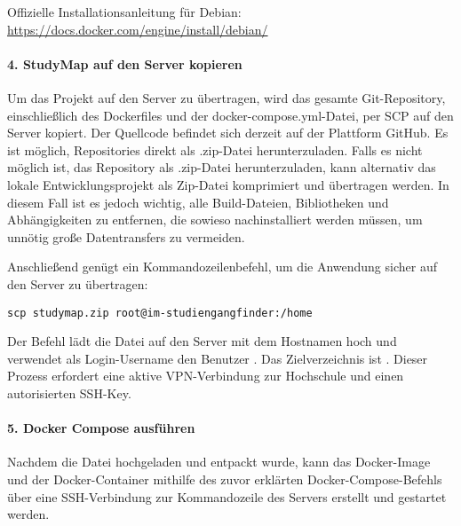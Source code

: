 \noindent
Offizielle Installationsanleitung für Debian: \url{https://docs.docker.com/engine/install/debian/}

\paragraph*{4. StudyMap auf den Server kopieren}
Um das Projekt auf den Server zu übertragen, wird das gesamte Git-Repository, einschließlich des Dockerfiles und der docker-compose.yml-Datei, per SCP auf den Server kopiert. Der Quellcode befindet sich derzeit auf der Plattform GitHub. Es ist möglich, Repositories direkt als .zip-Datei herunterzuladen. Falls es nicht möglich ist, das Repository als .zip-Datei herunterzuladen, kann alternativ das lokale Entwicklungsprojekt als Zip-Datei komprimiert und übertragen werden. In diesem Fall ist es jedoch wichtig, alle Build-Dateien, Bibliotheken und Abhängigkeiten zu entfernen, die sowieso nachinstalliert werden müssen, um unnötig große Datentransfers zu vermeiden.

Anschließend genügt ein Kommandozeilenbefehl, um die Anwendung sicher auf den Server zu übertragen:
\begin{lstlisting}[style=Python]
scp studymap.zip root@im-studiengangfinder:/home
\end{lstlisting}

Der Befehl lädt die Datei  auf den Server mit dem Hostnamen  hoch und verwendet als Login-Username den Benutzer . Das Zielverzeichnis ist . Dieser Prozess erfordert eine aktive VPN-Verbindung zur Hochschule und einen autorisierten SSH-Key. %

\paragraph*{5. Docker Compose ausführen}
Nachdem die Datei hochgeladen und entpackt wurde, kann das Docker-Image und der Docker-Container mithilfe des zuvor erklärten Docker-Compose-Befehls über eine SSH-Verbindung zur Kommandozeile des Servers erstellt und gestartet werden.

